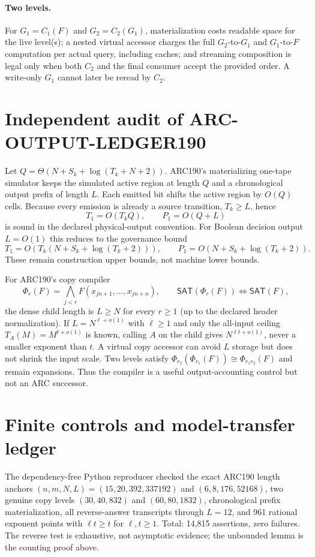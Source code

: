 \documentclass[11pt]{article}
\newcommand{\SAT}{\mathsf{SAT}}
\begin{document}
\paragraph{Two levels.}
For $G_1=C_1(F)$ and $G_2=C_2(G_1)$, materialization costs readable space for
the live level(s); a nested virtual accessor charges the full $G_2$-to-$G_1$
and $G_1$-to-$F$ computation per actual query, including caches; and streaming
composition is legal only when both $C_2$ and the final consumer accept the
provided order.  A write-only $G_1$ cannot later be reread by $C_2$.

\section{Independent audit of ARC-OUTPUT-LEDGER190}
Let $Q=\Theta(N+S_k+\log(T_k+N+2))$.  ARC190's materializing one-tape
simulator keeps the simulated active region at length $Q$ and a chronological
output prefix of length $L$.  Each emitted bit shifts the active region by
$O(Q)$ cells.  Because every emission is already a source transition,
$T_k\ge L$, hence
\[
 T_1=O(T_kQ),\qquad P_1=O(Q+L)
\]
is sound in the declared physical-output convention.  For Boolean decision
output $L=O(1)$ this reduces to the governance bound
\[
T_1=O(T_k(N+S_k+\log(T_k+2))),\qquad
P_1=O(N+S_k+\log(T_k+2)).
\]
These remain construction upper bounds, not machine lower bounds.

For ARC190's copy compiler
\[
\Phi_r(F)=\bigwedge_{j<r}F(x_{jn+1},\ldots,x_{jn+n}),
\qquad \SAT(\Phi_r(F))\iff\SAT(F),
\]
the dense child length is $L\ge N$ for every $r\ge1$ (up to the declared
header normalization).  If $L=N^{\ell+o(1)}$ with $\ell\ge1$ and only the
all-input ceiling $T_A(M)=M^{t+o(1)}$ is known, calling $A$ on the child gives
$N^{\ell t+o(1)}$, never a smaller exponent than $t$.  A virtual copy
accessor can avoid $L$ storage but does not shrink the input scale.  Two
levels satisfy $\Phi_{r_2}(\Phi_{r_1}(F))\cong\Phi_{r_1r_2}(F)$ and remain
expansions.  Thus the compiler is a useful output-accounting control but not
an ARC successor.

\section{Finite controls and model-transfer ledger}
The dependency-free Python reproducer checked the exact ARC190 length anchors
$(n,m,N,L)=(15,20,392,337192)$ and $(6,8,176,52168)$, two genuine copy levels
$(30,40,832)$ and $(60,80,1832)$, chronological prefix materialization,
all reverse-answer transcripts through $L=12$, and 961 rational exponent
points with $\ell t\ge t$ for $\ell,t\ge1$.  Total: 14,815 assertions, zero
failures.  The reverse test is exhaustive, not asymptotic evidence; the
unbounded lemma is the counting proof above.
\end{document}
